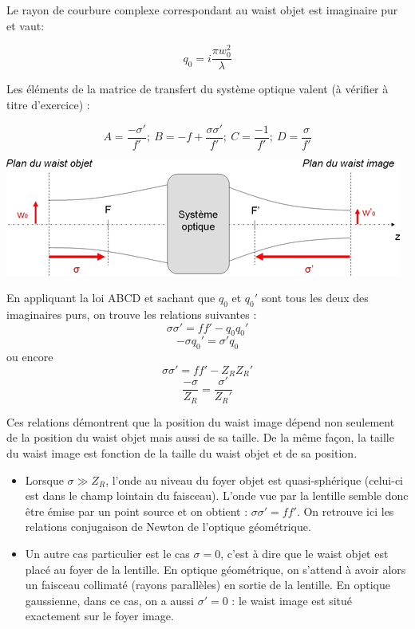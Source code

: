 \documentclass{book}
\begin{document}
Le rayon de courbure complexe correspondant au waist objet est imaginaire pur et vaut:

$$q_0=i\frac{\pi w_0^2}{\lambda}$$

Les éléments de la matrice de transfert du système optique valent (à vérifier à titre d'exercice) :

$$A=\frac {-\sigma '}{f'};\ B=-f+\frac{\sigma \sigma '}{f'};\ C=\frac{-1}{f'};\ D=\frac \sigma {f'}$$

{\centering
\includegraphics[scale=1.7]{images/fig13.jpg}
\par}

En appliquant la loi ABCD et sachant que $q_0$ et $q_0'$ sont tous les deux des imaginaires purs, on trouve les relations suivantes :
$$\sigma \sigma ' = f f'-q_0q_0'$$
$$-\sigma q_0' = \sigma ' q_0$$
ou encore
$$\sigma \sigma ' = f f'-Z_RZ_R'$$
$$\frac {-\sigma}{Z_R} = \frac {\sigma '}{Z_R'}$$

Ces relations démontrent que la position du waist image dépend non seulement de la position du waist objet mais aussi de sa taille. De la même façon, la taille du waist image est fonction de la taille du waist objet et de sa position.
\begin{itemize}
    \item     Lorsque $\sigma \gg Z_R$, l'onde au niveau du foyer objet est quasi-sphérique (celui-ci est dans le champ lointain du faisceau). L'onde vue par la lentille semble donc être émise par un point source et on obtient : $\sigma \sigma ' = f f'$. On retrouve ici les relations conjugaison de Newton de l'optique géométrique.
    \item Un autre cas particulier est le cas $\sigma = 0$, c'est à dire que le waist objet est placé au foyer de la lentille. En optique géométrique, on s'attend à avoir alors un faisceau collimaté (rayons parallèles) en sortie de la lentille. En optique gaussienne, dans ce cas, on a aussi $\sigma ' = 0$ : le waist image est situé exactement sur le foyer image.
\end{itemize}
\end{document}
